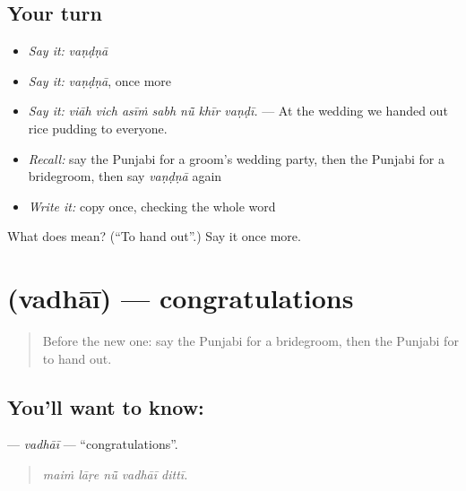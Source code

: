 \subsection*{Your turn}
\begin{itemize}
\raggedright
  \item \emph{Say it:} \emph{vaṇḍṇā}
  \item \emph{Say it:} \emph{vaṇḍṇā}, once more
  \item \emph{Say it:} \emph{viāh vich asīṁ sabh nū̃ khīr vaṇḍī.} — At the wedding we handed out rice pudding to everyone.
  \item \emph{Recall:} say the Punjabi for a groom's wedding party, then the Punjabi for a bridegroom, then say \emph{vaṇḍṇā} again
  \item \emph{Write it:} copy \textbf{} once, checking the whole word
\end{itemize}

\begin{tcolorbox}[breakable,colback=teal!4,colframe=teal!35!black,title={Before you move on}]
What does  mean? (\textquotedblleft{}To hand out\textquotedblright{}.) Say it once more.
\end{tcolorbox}
\section[\texorpdfstring{\pa{ਵਧਾਈ} (vadhāī)}{ਵਧਾਈ (vadhāī)}]{ (vadhāī) — congratulations}

\label{lesson:PA-C313-vadhai}



\begin{quote}
Before the new one: say the Punjabi for a bridegroom, then the Punjabi for to hand out.
\end{quote}

\subsection*{You'll want to know: }
\textbf{} — \emph{vadhāī} — \textquotedblleft{}congratulations\textquotedblright{}.

\begin{quote}
    
\end{quote}

\begin{quote}
\emph{maiṁ lāṛe nū̃ vadhāī dittī.}
\end{quote}

